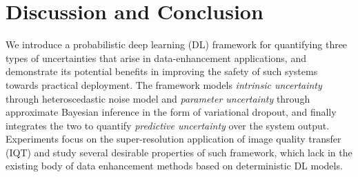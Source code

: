 \section{Discussion and Conclusion}

We introduce a probabilistic deep learning (DL) framework for quantifying three types of uncertainties that arise in data-enhancement applications, and demonstrate its potential benefits in improving the safety of such systems towards practical deployment. The framework models \textit{intrinsic uncertainty} through heteroscedastic noise model and \textit{parameter uncertainty} through approximate Bayesian inference in the form of variational dropout, and finally integrates the two to quantify \textit{predictive uncertainty} over the system output.  Experiments focus on the super-resolution application of image quality transfer (IQT)\cite{alexander2017image} and study several desirable properties of such framework, which lack in the existing body of data enhancement methods based on deterministic DL models. 

